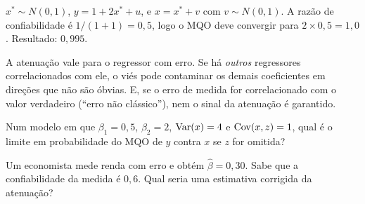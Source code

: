 \begin{simulacao}
$x^*\sim N(0,1)$, $y=1+2x^*+u$, e $x=x^*+v$ com $v\sim N(0,1)$. A razão de confiabilidade é $1/(1+1)=0{,}5$, logo o MQO deve convergir para $2\times0{,}5=1{,}0$. Resultado: $0{,}995$.
\end{simulacao}

\begin{atencao}
A atenuação vale para o regressor com erro. Se há \emph{outros} regressores correlacionados com ele, o viés pode contaminar os demais coeficientes em direções que não são óbvias. E, se o erro de medida for correlacionado com o valor verdadeiro (``erro não clássico''), nem o sinal da atenuação é garantido.
\end{atencao}

\begin{exercicio}
Num modelo em que $\beta_1=0{,}5$, $\beta_2=2$, $\operatorname{Var}(x)=4$ e $\operatorname{Cov}(x,z)=1$, qual é o limite em probabilidade do MQO de $y$ contra $x$ se $z$ for omitida?
\end{exercicio}

\begin{exercicio}
Um economista mede renda com erro e obtém $\hat\beta=0{,}30$. Sabe que a confiabilidade da medida é $0{,}6$. Qual seria uma estimativa corrigida da atenuação?
\end{exercicio}
